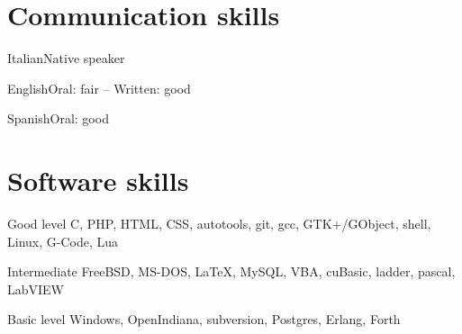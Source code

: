 \documentclass[fontsize=10pt]{tccv}
\begin{document}
\section{Communication skills}

\begin{factlist}
\item{Italian}{Native speaker}
\item{English}{Oral: fair -- Written: good}
\item{Spanish}{Oral: good}
\end{factlist}

\section{Software skills}

\begin{factlist}

\item{Good level}
     {C, PHP, HTML, CSS, autotools, git, gcc, GTK+/GObject, shell,
      Linux, G-Code, Lua}

\item{Intermediate}
     {FreeBSD, MS-DOS, \LaTeX, MySQL, VBA, cuBasic, ladder, pascal,
      LabVIEW}

\item{Basic level}
     {Windows, OpenIndiana, subversion, Postgres, Erlang, Forth}

\end{factlist}
\end{document}
